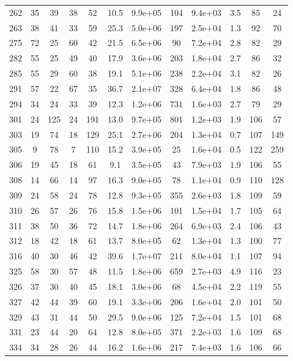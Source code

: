\begin{table}
\begin{tabular}{cccccccccccc}
262 & 35 & 39 & 38 & 52 & 10.5 & 9.9e+05 & 104 & 9.4e+03 & 3.5 & 85 & 24 \\
263 & 38 & 41 & 33 & 59 & 25.3 & 5.0e+06 & 197 & 2.5e+04 & 1.3 & 92 & 70 \\
275 & 72 & 25 & 60 & 42 & 21.5 & 6.5e+06 & 90 & 7.2e+04 & 2.8 & 82 & 29 \\
282 & 55 & 25 & 49 & 40 & 17.9 & 3.6e+06 & 203 & 1.8e+04 & 2.7 & 86 & 32 \\
285 & 55 & 29 & 60 & 38 & 19.1 & 5.1e+06 & 238 & 2.2e+04 & 3.1 & 82 & 26 \\
291 & 57 & 22 & 67 & 35 & 36.7 & 2.1e+07 & 328 & 6.4e+04 & 1.8 & 86 & 48 \\
294 & 34 & 24 & 33 & 39 & 12.3 & 1.2e+06 & 731 & 1.6e+03 & 2.7 & 79 & 29 \\
301 & 24 & 125 & 24 & 191 & 13.0 & 9.7e+05 & 801 & 1.2e+03 & 1.9 & 106 & 57 \\
303 & 19 & 74 & 18 & 129 & 25.1 & 2.7e+06 & 204 & 1.3e+04 & 0.7 & 107 & 149 \\
305 & 9 & 78 & 7 & 110 & 15.2 & 3.9e+05 & 25 & 1.6e+04 & 0.5 & 122 & 259 \\
306 & 19 & 45 & 18 & 61 & 9.1 & 3.5e+05 & 43 & 7.9e+03 & 1.9 & 106 & 55 \\
308 & 14 & 66 & 14 & 97 & 16.3 & 9.0e+05 & 78 & 1.1e+04 & 0.9 & 110 & 128 \\
309 & 24 & 58 & 24 & 78 & 12.8 & 9.3e+05 & 355 & 2.6e+03 & 1.8 & 109 & 59 \\
310 & 26 & 57 & 26 & 76 & 15.8 & 1.5e+06 & 101 & 1.5e+04 & 1.7 & 105 & 64 \\
311 & 38 & 50 & 36 & 72 & 14.7 & 1.8e+06 & 264 & 6.9e+03 & 2.4 & 106 & 43 \\
312 & 18 & 42 & 18 & 61 & 13.7 & 8.0e+05 & 62 & 1.3e+04 & 1.3 & 100 & 77 \\
316 & 40 & 30 & 46 & 42 & 39.6 & 1.7e+07 & 211 & 8.0e+04 & 1.1 & 107 & 94 \\
325 & 58 & 30 & 57 & 48 & 11.5 & 1.8e+06 & 659 & 2.7e+03 & 4.9 & 116 & 23 \\
326 & 37 & 30 & 40 & 45 & 18.1 & 3.0e+06 & 68 & 4.5e+04 & 2.2 & 119 & 55 \\
327 & 42 & 44 & 39 & 60 & 19.1 & 3.3e+06 & 206 & 1.6e+04 & 2.0 & 101 & 50 \\
329 & 43 & 31 & 44 & 50 & 29.5 & 9.0e+06 & 125 & 7.2e+04 & 1.5 & 101 & 68 \\
331 & 23 & 44 & 20 & 64 & 12.8 & 8.0e+05 & 371 & 2.2e+03 & 1.6 & 109 & 68 \\
334 & 34 & 28 & 26 & 44 & 16.2 & 1.6e+06 & 217 & 7.4e+03 & 1.6 & 106 & 66 \\

\end{tabular}
\end{table}
